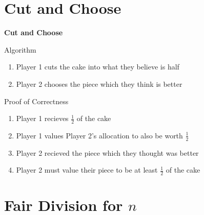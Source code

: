 \documentclass[aspectratio=169,xcolor=dvipsnames]{beamer}
\begin{document}
\section{Cut and Choose}
\begin{frame}
	\Huge{\centerline{\textbf{Cut and Choose}}}
\end{frame}
\begin{frame}{Algorithm}
	\begin{enumerate}
		\item Player 1 cuts the cake into what they believe is half
		\item Player 2 chooses the piece which they think is better
	\end{enumerate}
\end{frame}
\begin{frame}{Proof of Correctness}
	\begin{enumerate}
		\item Player 1 recieves $\frac{1}{2}$ of the cake
		\item Player 1 values Player 2's allocation to also be worth $\frac{1}{2}$\pause
		\item Player 2 recieved the piece which they thought was better
		\item Player 2 must value their piece to be at least $\frac{1}{2}$ of the cake
	\end{enumerate}
\end{frame}
\section{Fair Division for $n$}
\end{document}
